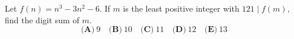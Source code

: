 Let $f(n)=n^3-3n^2-6$. If $m$ is the least positive integer with $121\mid f(m)$, find the digit sum of $m$.
\[\textbf{(A)}~9\quad\textbf{(B)}~10\quad\textbf{(C)}~11\quad\textbf{(D)}~12\quad\textbf{(E)}~13\]
